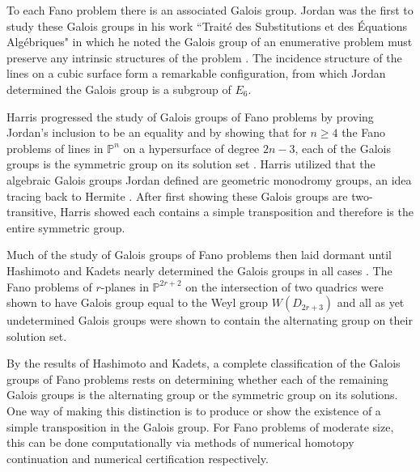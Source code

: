 \documentclass[12pt]{amsart}
\theoremstyle{definition}
\newcommand{\defcolor}[1]{{\color{RoyalBlue}#1}}
\begin{document}
%
%
To each Fano problem there is an associated Galois group. Jordan was the first to study these Galois groups in his work  ``Trait\'{e} des Substitutions et des \'{E}quations Alg\'{e}briques" in which he noted the Galois group of an enumerative problem must preserve any intrinsic structures of the problem \cite{Jordan}. The incidence structure of the lines on a cubic surface form a remarkable configuration, from which Jordan determined the Galois group is a subgroup of $E_6$. 

Harris progressed the study of Galois groups of Fano problems by proving Jordan's inclusion to be an equality and by showing that for $n\ge 4$ the Fano problems of lines in $\mathbb{P}^n$ on a hypersurface of degree $2n-3$, each of the Galois groups is the symmetric group on its solution set \cite{Harris}. Harris utilized that the algebraic Galois groups Jordan defined are geometric monodromy groups, an idea tracing back to Hermite \cite{Hermite}. After first showing these Galois groups are two-transitive, Harris showed each contains a simple transposition and therefore is the entire symmetric group. 

Much of the study of Galois groups of Fano problems then laid dormant until Hashimoto and Kadets nearly determined the Galois groups in all cases \cite{HK}. The Fano problems of $r$-planes in $\mathbb{P}^{2r+2}$ on the intersection of two quadrics were shown to have Galois group equal to the Weyl group $W(D_{2r+3})$ and all as yet undetermined Galois groups were shown to contain the alternating group on their solution set.


%
By the results of Hashimoto and Kadets, a complete classification of the Galois groups of Fano problems rests on determining whether each of the remaining Galois groups is the alternating group or the symmetric group on its solutions. One way of making this distinction is to produce or show the existence of a simple transposition in the Galois group. For Fano problems of moderate size, this can be done computationally via methods of numerical homotopy continuation and numerical certification respectively.
\end{document}
